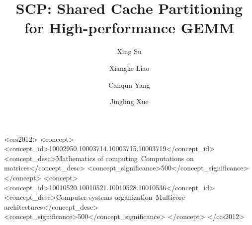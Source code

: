 \documentclass[format=acmsmall, review=true, screen=true, anonymous=false]{acmart}
\begin{document}
\title{SCP: Shared Cache Partitioning for High-performance GEMM}

\author{Xing Su}
\author{Xiangke Liao}
\author{Canqun Yang}
\author{Jingling Xue}



%
%
\begin{CCSXML}
<ccs2012>
<concept>
<concept_id>10002950.10003714.10003715.10003719</concept_id>
<concept_desc>Mathematics of computing~Computations on matrices</concept_desc>
<concept_significance>500</concept_significance>
</concept>
<concept>
<concept_id>10010520.10010521.10010528.10010536</concept_id>
<concept_desc>Computer systems organization~Multicore architectures</concept_desc>
<concept_significance>500</concept_significance>
</concept>
</ccs2012>
\end{CCSXML}


%
%


\maketitle











\end{document}
